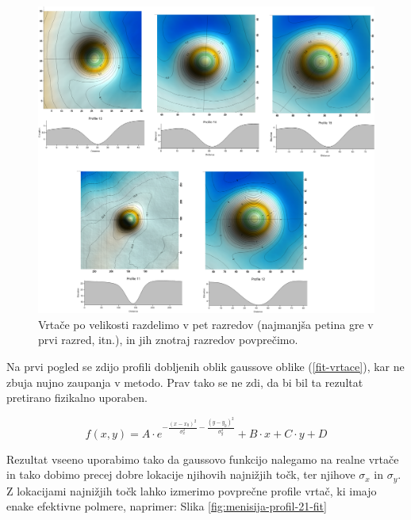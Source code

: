 \documentclass[a4paper, oneside, 12pt]{book}
\begin{document}
\begin{figure}[H]
  \centering
  \includegraphics[width=13cm]{slike/vrtace-po-razredih-menisija}
  \caption{Vrtače po velikosti razdelimo v pet razredov (najmanjša petina gre v prvi razred, itn.), in jih znotraj razredov povprečimo.}
  \label{fig:menisija-vrtace-po-razredih}
\end{figure}

Na prvi pogled se zdijo profili dobljenih oblik gaussove oblike (\ref{fit-vrtace}), kar ne zbuja nujno zaupanja v metodo. Prav tako se ne zdi, da bi bil ta rezultat pretirano fizikalno uporaben.

\begin{equation}
  f(x,y) = A \cdot e^{-\frac{(x-x_0)^2}{\sigma_x^2}-\frac{(y-y_0)^2}{\sigma_y^2}} + B \cdot x + C \cdot y + D  
  \label{fit-vrtace}
\end{equation}

Rezultat vseeno uporabimo tako da gaussovo funkcijo nalegamo na realne vrtače in tako dobimo precej dobre lokacije njihovih najnižjih točk, ter njihove $\sigma_x$ in $\sigma_y$. Z lokacijami najnižjih točk lahko izmerimo povprečne profile vrtač, ki imajo enake efektivne polmere, naprimer: Slika \ref{fig:menisija-profil-21-fit}
\end{document}

